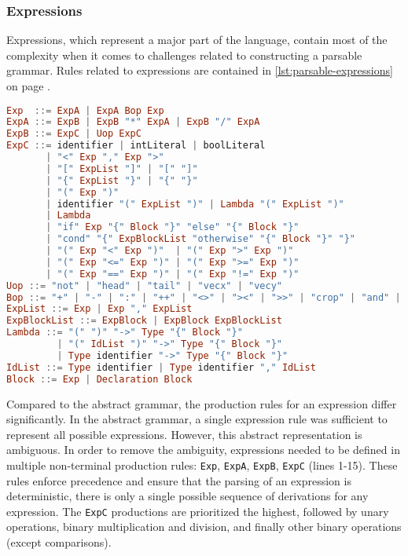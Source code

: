\subsubsection{Expressions}
Expressions, which represent a major part of the language, contain most of the complexity when it comes to challenges related to constructing a parsable grammar. Rules related to expressions are contained in \cref{lst:parsable-expressions} on page .  
\begin{lstlisting}[language=haskell, float=htb,
caption=Parsable production rules for expressions,
label=lst:parsable-expressions]
Exp  ::= ExpA | ExpA Bop Exp
ExpA ::= ExpB | ExpB "*" ExpA | ExpB "/" ExpA
ExpB ::= ExpC | Uop ExpC
ExpC ::= identifier | intLiteral | boolLiteral
       | "<" Exp "," Exp ">"
       | "[" ExpList "]" | "[" "]"
       | "{" ExpList "}" | "{" "}"
       | "(" Exp ")"
       | identifier "(" ExpList ")" | Lambda "(" ExpList ")"
       | Lambda
       | "if" Exp "{" Block "}" "else" "{" Block "}"
       | "cond" "{" ExpBlockList "otherwise" "{" Block "}" "}"
       | "(" Exp "<" Exp ")"  | "(" Exp ">" Exp ")"
       | "(" Exp "<=" Exp ")" | "(" Exp ">=" Exp ")"
       | "(" Exp "==" Exp ")" | "(" Exp "!=" Exp ")"
Uop ::= "not" | "head" | "tail" | "vecx" | "vecy"
Bop ::= "+" | "-" | ":" | "++" | "<>" | "><" | ">>" | "crop" | "and" | "or"
ExpList ::= Exp | Exp "," ExpList
ExpBlockList ::= ExpBlock | ExpBlock ExpBlockList
Lambda ::= "(" ")" "->" Type "{" Block "}"
         | "(" IdList ")" "->" Type "{" Block "}"
         | Type identifier "->" Type "{" Block "}"
IdList ::= Type identifier | Type identifier "," IdList 
Block ::= Exp | Declaration Block
\end{lstlisting}
\par Compared to the abstract grammar, the production rules for an expression differ significantly. In the abstract grammar, a single expression rule was sufficient to represent all possible expressions. However, this abstract representation is ambiguous. In order to remove the ambiguity, expressions needed to be defined in multiple non-terminal production rules: \lstinline{Exp}, \lstinline{ExpA}, \lstinline{ExpB}, \lstinline{ExpC} (lines 1-15). These rules enforce precedence and ensure that the parsing of an expression is deterministic, there is only a single possible sequence of derivations for any expression. The \lstinline{ExpC} productions are prioritized the highest, followed by unary operations, binary multiplication and division, and finally other binary operations (except comparisons). 
